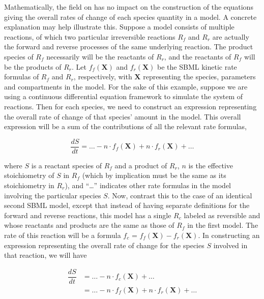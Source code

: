 Mathematically, the  field on \Reaction has no
impact on the construction of the equations giving the overall
rates of change of each species quantity in a model.  A concrete
explanation may help illustrate this.  Suppose a model consists of
multiple reactions, of which two particular irreversible reactions
$R_f$ and $R_r$ are actually the forward and reverse processes of
the same underlying reaction.  The product species of $R_f$
necessarily will be the reactants of $R_r$, and the reactants of
$R_f$ will be the products of $R_r$.  Let $f_f(\mathbf{X})$ and
$f_r(\mathbf{X})$ be the SBML kinetic rate formulas of $R_f$ and
$R_r$, respectively, with $\mathbf{X}$ representing the species,
parameters and compartments in the model.  For the sake of this
example, suppose we are using a continuous differential equation
framework to simulate the system of reactions.  Then for each
species, we need to construct an expression representing the
overall rate of change of that species' amount in the model.  This
overall expression will be a sum of the contributions of all the
relevant rate formulas,
\begin{linenomath}
  \begin{equation*}
    \frac{dS}{dt} =  \ldots - n \! \cdot \! f_f(\mathbf{X}) + n \! \cdot \! f_r(\mathbf{X}) + \ldots 
  \end{equation*}
\end{linenomath}
where $S$ is a reactant species of $R_f$ and a product of $R_r$,
$n$ is the effective stoichiometry of $S$ in $R_f$ (which by
implication must be the same as its stoichiometry in $R_r$), and
``\ldots'' indicates other rate formulas in the model involving
the particular species $S$.  Now, contrast this to the case of an
identical second SBML model, except that instead of having
separate \Reaction definitions for the forward and reverse
reactions, this model has a single \Reaction $R_c$ labeled as
reversible and whose reactants and products are the same as those
of $R_f$ in the first model.  The rate of this reaction will be a
formula $f_c$ = $f_f(\mathbf{X}) - f_r(\mathbf{X})$.  In
constructing an expression representing the overall rate of change
for the species $S$ involved in that reaction, we will have
\begin{linenomath}
  \begin{equation*}
    \begin{aligned}
      \dfrac{dS}{dt} & = \ldots - n \! \cdot \! f_c(\mathbf{X}) + \ldots \\
                     & = \ldots - n \! \cdot \! f_f(\mathbf{X}) + n \! \cdot \! f_r(\mathbf{X}) + \ldots 
    \end{aligned}
  \end{equation*}
\end{linenomath}

